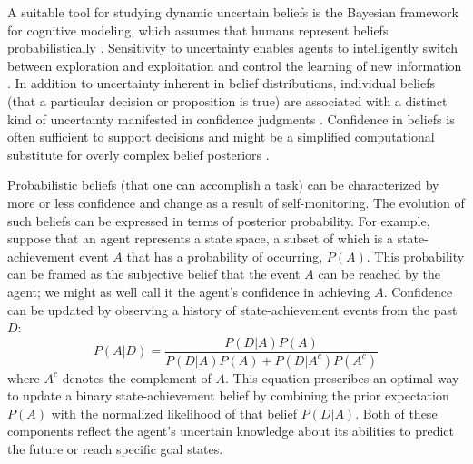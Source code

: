 A suitable tool for studying dynamic uncertain beliefs is the Bayesian framework for cognitive modeling, which assumes that humans represent beliefs probabilistically \parencite{sun_bayesian_2008,perfors_tutorial_2011,coenen_asking_2019}. Sensitivity to uncertainty enables agents to intelligently switch between exploration and exploitation \parencite{cohen_should_2007} and control the learning of new information \parencite{meyniel_confidence_2015}. In addition to uncertainty inherent in belief distributions, individual beliefs (that a particular decision or proposition is true) are associated with a distinct kind of uncertainty manifested in confidence judgments \parencite{pouget_confidence_2016}. Confidence in beliefs is often sufficient to support decisions and might be a simplified computational substitute for overly complex belief posteriors \parencite{pouget_confidence_2016}.  

Probabilistic beliefs (that one can accomplish a task) can be characterized by more or less confidence and change as a result of self-monitoring. The evolution of such beliefs can be expressed in terms of posterior probability. For example, suppose that an agent represents a state space, a subset of which is a state-achievement event $A$ that has a probability of occurring, $P(A)$. This probability can be framed as the subjective belief that the event $A$ can be reached by the agent; we might as well call it the agent's confidence in achieving $A$. Confidence can be updated by observing a history of state-achievement events from the past $D$:
\begin{equation}
    P(A|D) = \frac{P(D|A) P(A)}{P(D|A)P(A) + P(D|A^c)P(A^c)}
\end{equation}
where $A^c$ denotes the complement of $A$. This equation prescribes an optimal way to update a binary state-achievement belief by combining the prior expectation $P(A)$ with the normalized likelihood of that belief $P(D|A)$. Both of these components reflect the agent's uncertain knowledge about its abilities to predict the future or reach specific goal states.

